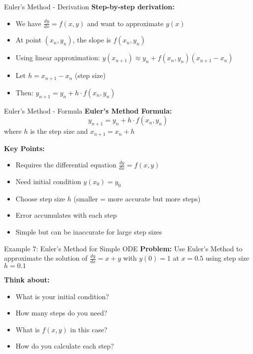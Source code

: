 \documentclass[aspectratio=169]{beamer}
\begin{document}
\begin{frame}{Euler's Method - Derivation}
\textbf{Step-by-step derivation:}
\begin{itemize}
    \item We have $\frac{dy}{dx} = f(x,y)$ and want to approximate $y(x)$
    \item At point $(x_n, y_n)$, the slope is $f(x_n, y_n)$
    \item Using linear approximation: $y(x_{n+1}) \approx y_n + f(x_n, y_n)(x_{n+1} - x_n)$
    \item Let $h = x_{n+1} - x_n$ (step size)
    \item Then: $y_{n+1} = y_n + h \cdot f(x_n, y_n)$
\end{itemize}
\end{frame}

\begin{frame}{Euler's Method - Formula}
\textbf{Euler's Method Formula:}
\[y_{n+1} = y_n + h \cdot f(x_n, y_n)\]
where $h$ is the step size and $x_{n+1} = x_n + h$

\textbf{Key Points:}
\begin{itemize}
    \item Requires the differential equation $\frac{dy}{dx} = f(x,y)$
    \item Need initial condition $y(x_0) = y_0$
    \item Choose step size $h$ (smaller = more accurate but more steps)
    \item Error accumulates with each step
    \item Simple but can be inaccurate for large step sizes
\end{itemize}
\end{frame}

\begin{frame}{Example 7: Euler's Method for Simple ODE}
\textbf{Problem:} Use Euler's Method to approximate the solution of $\frac{dy}{dx} = x + y$ with $y(0) = 1$ at $x = 0.5$ using step size $h = 0.1$

\textbf{Think about:}
\begin{itemize}
    \item What is your initial condition?
    \item How many steps do you need?
    \item What is $f(x,y)$ in this case?
    \item How do you calculate each step?
\end{itemize}
\end{frame}
\end{document}

